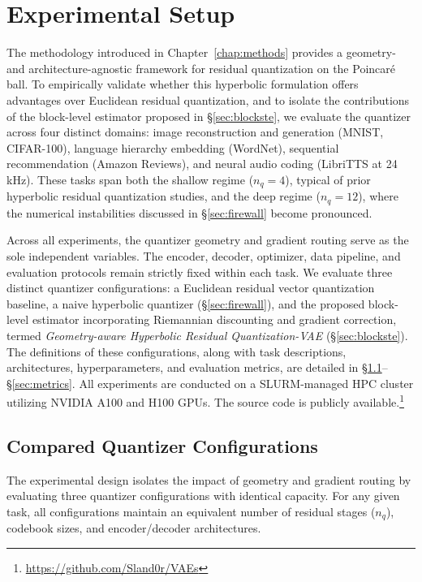 \documentclass[12pt]{report}
\begin{document}
\chapter{Experimental Setup}
\label{chap:expsetup}

The methodology introduced in Chapter~\ref{chap:methods} provides a geometry- and architecture-agnostic framework for residual quantization on the Poincar\'e ball. To empirically validate whether this hyperbolic formulation offers advantages over Euclidean residual quantization, and to isolate the contributions of the block-level estimator proposed in \S\ref{sec:blockste}, we evaluate the quantizer across four distinct domains: image reconstruction and generation (MNIST, CIFAR-100), language hierarchy embedding (WordNet), sequential recommendation (Amazon Reviews), and neural audio coding (LibriTTS at 24\,kHz). These tasks span both the shallow regime ($n_q=4$), typical of prior hyperbolic residual quantization studies, and the deep regime ($n_q=12$), where the numerical instabilities discussed in \S\ref{sec:firewall} become pronounced.

Across all experiments, the quantizer geometry and gradient routing serve as the sole independent variables. The encoder, decoder, optimizer, data pipeline, and evaluation protocols remain strictly fixed within each task. We evaluate three distinct quantizer configurations: a Euclidean residual vector quantization baseline, a naive hyperbolic quantizer (\S\ref{sec:firewall}), and the proposed block-level estimator incorporating Riemannian discounting and gradient correction, termed \emph{Geometry-aware Hyperbolic Residual Quantization-VAE} (\S\ref{sec:blockste}). The definitions of these configurations, along with task descriptions, architectures, hyperparameters, and evaluation metrics, are detailed in \S\ref{sec:configs}--\S\ref{sec:metrics}. All experiments are conducted on a SLURM-managed HPC cluster utilizing NVIDIA A100 and H100 GPUs. The source code is publicly available.\footnote{\url{https://github.com/Sland0r/VAEs}}

\section{Compared Quantizer Configurations}
\label{sec:configs}

The experimental design isolates the impact of geometry and gradient routing by evaluating three quantizer configurations with identical capacity. For any given task, all configurations maintain an equivalent number of residual stages ($n_q$), codebook sizes, and encoder/decoder architectures.
\end{document}
